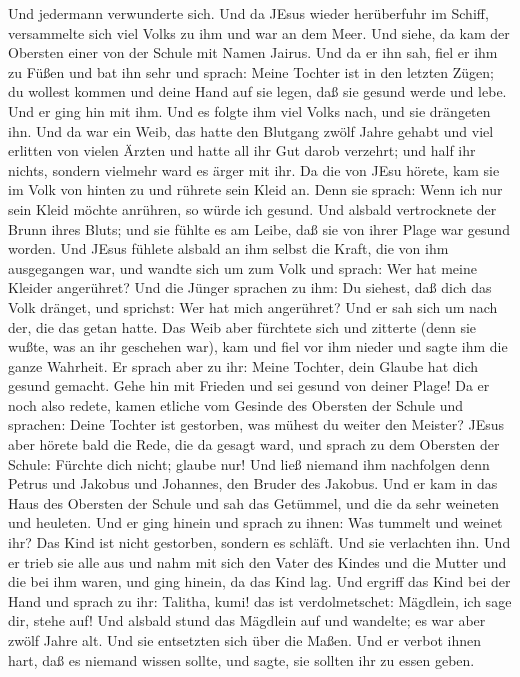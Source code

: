 Und jedermann verwunderte sich.  Und da JEsus wieder
herüberfuhr im Schiff, versammelte sich viel Volks zu ihm und war an dem
Meer.  Und siehe, da kam der Obersten einer von der Schule
mit Namen Jairus. Und da er ihn sah, fiel er ihm zu Füßen 
und bat ihn sehr und sprach: Meine Tochter ist in den letzten Zügen; du
wollest kommen und deine Hand auf sie legen, daß sie gesund werde und
lebe.  Und er ging hin mit ihm. Und es folgte ihm viel
Volks nach, und sie drängeten ihn.  Und da war ein Weib,
das hatte den Blutgang zwölf Jahre gehabt  und viel
erlitten von vielen Ärzten und hatte all ihr Gut darob verzehrt; und
half ihr nichts, sondern vielmehr ward es ärger mit ihr. 
Da die von JEsu hörete, kam sie im Volk von hinten zu und rührete sein
Kleid an.  Denn sie sprach: Wenn ich nur sein Kleid möchte
anrühren, so würde ich gesund.  Und alsbald vertrocknete
der Brunn ihres Bluts; und sie fühlte es am Leibe, daß sie von ihrer
Plage war gesund worden.  Und JEsus fühlete alsbald an ihm
selbst die Kraft, die von ihm ausgegangen war, und wandte sich um zum
Volk und sprach: Wer hat meine Kleider angerühret?  Und die
Jünger sprachen zu ihm: Du siehest, daß dich das Volk dränget, und
sprichst: Wer hat mich angerühret?  Und er sah sich um nach
der, die das getan hatte.  Das Weib aber fürchtete sich und
zitterte (denn sie wußte, was an ihr geschehen war), kam und fiel vor
ihm nieder und sagte ihm die ganze Wahrheit.  Er sprach
aber zu ihr: Meine Tochter, dein Glaube hat dich gesund gemacht. Gehe
hin mit Frieden und sei gesund von deiner Plage!  Da er
noch also redete, kamen etliche vom Gesinde des Obersten der Schule und
sprachen: Deine Tochter ist gestorben, was mühest du weiter den Meister?
 JEsus aber hörete bald die Rede, die da gesagt ward, und
sprach zu dem Obersten der Schule: Fürchte dich nicht; glaube nur!
 Und ließ niemand ihm nachfolgen denn Petrus und Jakobus
und Johannes, den Bruder des Jakobus.  Und er kam in das
Haus des Obersten der Schule und sah das Getümmel, und die da sehr
weineten und heuleten.  Und er ging hinein und sprach zu
ihnen: Was tummelt und weinet ihr? Das Kind ist nicht gestorben, sondern
es schläft. Und sie verlachten ihn.  Und er trieb sie alle
aus und nahm mit sich den Vater des Kindes und die Mutter und die bei
ihm waren, und ging hinein, da das Kind lag.  Und ergriff
das Kind bei der Hand und sprach zu ihr: Talitha, kumi! das ist
verdolmetschet: Mägdlein, ich sage dir, stehe auf!  Und
alsbald stund das Mägdlein auf und wandelte; es war aber zwölf Jahre
alt. Und sie entsetzten sich über die Maßen.  Und er verbot
ihnen hart, daß es niemand wissen sollte, und sagte, sie sollten ihr zu
essen geben.


